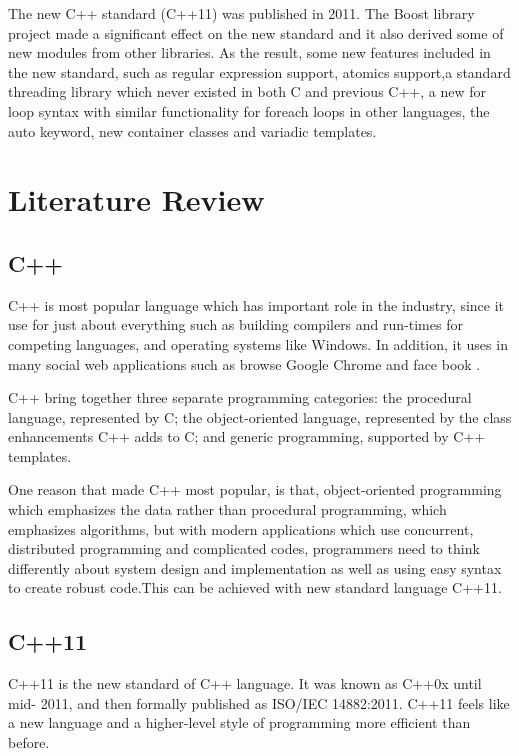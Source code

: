 \documentclass[11pt,]{report}
\begin{document}
The new C++ standard (C++11) was published in 2011. The Boost library project made a significant effect on the new standard and it also derived some of new modules from other libraries. As the result, some new features included in the new standard, such as regular expression support, atomics support,\linebreak a standard threading library which never existed in both C and previous C++, a new for loop syntax with similar functionality for foreach loops in other \linebreak languages, the auto keyword, new container classes and variadic templates\cite{CplusplusHistoryofCpp}. 


\chapter{Literature Review}

\section{C++}
\label{section: C++}
C++ is most popular language which has important role in the industry, since it use for just about everything such as building compilers and run-times for competing languages, and operating systems like Windows. In addition, it uses in many social web applications such as browse Google Chrome and face book \cite{ISO:2011:Cpplanguage}.

C++ bring together three separate programming categories: the procedural language, represented by C; the object-oriented language, represented by the class enhancements C++ adds to C; and generic programming, supported by C++ templates\cite{Prata:2012:Cpp}.

One reason that made C++ most popular, is that, object-oriented \linebreak programming which emphasizes the data rather than procedural programming, which emphasizes algorithms, but with modern applications which use \linebreak concurrent, distributed programming and complicated codes, programmers need to think differently about system design and implementation as well as using easy syntax  to create robust code.This can be achieved with new standard \linebreak language C++11\cite{Stroustrup:2012:Cpp11}.

\section{C++11}
\label{section: C++11}
C++11 is the new standard of C++ language. It was known as C++0x until mid- 2011, and then formally published as ISO/IEC 14882:2011. C++11 feels like a new language and a higher-level style of programming more efficient than before\cite{ISO:2011:Cpplanguage}. 
\end{document}
